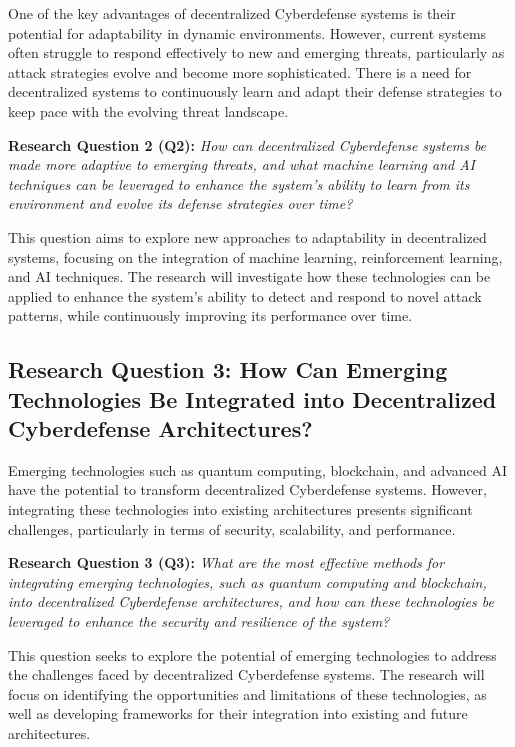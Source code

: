 One of the key advantages of decentralized Cyberdefense systems is their potential for adaptability in dynamic environments. However, current systems often struggle to respond effectively to new and emerging threats, particularly as attack strategies evolve and become more sophisticated. There is a need for decentralized systems to continuously learn and adapt their defense strategies to keep pace with the evolving threat landscape.

\textbf{Research Question 2 (Q2):} \textit{How can decentralized Cyberdefense systems be made more adaptive to emerging threats, and what machine learning and AI techniques can be leveraged to enhance the system's ability to learn from its environment and evolve its defense strategies over time?}

This question aims to explore new approaches to adaptability in decentralized systems, focusing on the integration of machine learning, reinforcement learning, and AI techniques. The research will investigate how these technologies can be applied to enhance the system's ability to detect and respond to novel attack patterns, while continuously improving its performance over time.


\subsection{Research Question 3: How Can Emerging Technologies Be Integrated into Decentralized Cyberdefense Architectures?}

Emerging technologies such as quantum computing, blockchain, and advanced AI have the potential to transform decentralized Cyberdefense systems. However, integrating these technologies into existing architectures presents significant challenges, particularly in terms of security, scalability, and performance.

\textbf{Research Question 3 (Q3):} \textit{What are the most effective methods for integrating emerging technologies, such as quantum computing and blockchain, into decentralized Cyberdefense architectures, and how can these technologies be leveraged to enhance the security and resilience of the system?}

This question seeks to explore the potential of emerging technologies to address the challenges faced by decentralized Cyberdefense systems. The research will focus on identifying the opportunities and limitations of these technologies, as well as developing frameworks for their integration into existing and future architectures.



